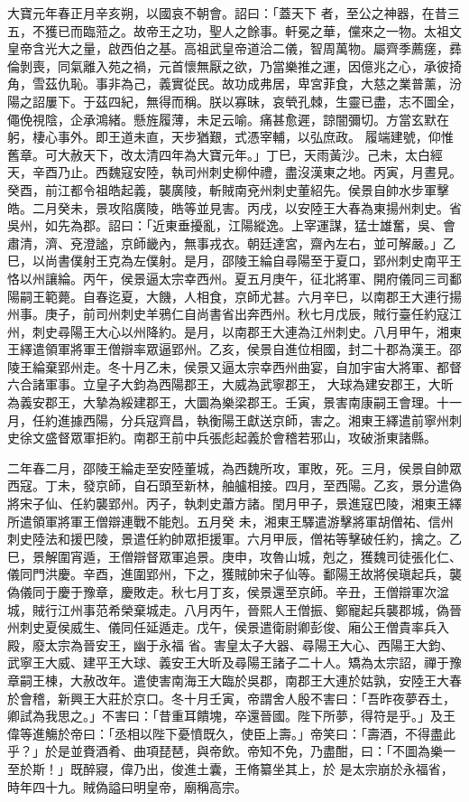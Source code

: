 \begin{pinyinscope}
 大寶元年春正月辛亥朔，以國哀不朝會。詔曰：「蓋天下
 者，至公之神器，在昔三五，不獲已而臨蒞之。故帝王之功，聖人之餘事。軒冕之華，儻來之一物。太祖文皇帝含光大之量，啟西伯之基。高祖武皇帝道洽二儀，智周萬物。屬齊季薦瘥，彞倫剝喪，同氣離入苑之禍，元首懷無厭之欲，乃當樂推之運，因億兆之心，承彼掎角，雪茲仇恥。事非為己，義實從民。故功成弗居，卑宮菲食，大慈之業普薰，汾陽之詔屢下。于茲四紀，無得而稱。朕以寡昧，哀煢孔棘，生靈已盡，志不圖全，僶俛視陰，企承鴻緒。懸旌履薄，未足云喻。痛甚愈遲，諒闇彌切。方當玄默在躬，棲心事外。即王道未直，天步猶艱，式憑宰輔，以弘庶政。
 履端建號，仰惟舊章。可大赦天下，改太清四年為大寶元年。」丁巳，天雨黃沙。己未，太白經天，辛酉乃止。西魏寇安陸，執司州刺史柳仲禮，盡沒漢東之地。丙寅，月晝見。癸酉，前江都令祖皓起義，襲廣陵，斬賊南兗州刺史董紹先。侯景自帥水步軍擊皓。二月癸未，景攻陷廣陵，皓等並見害。丙戌，以安陸王大春為東揚州刺史。省吳州，如先為郡。詔曰：「近東垂擾亂，江陽縱逸。上宰運謀，猛士雄奮，吳、會肅清，濟、兗澄謐，京師畿內，無事戎衣。朝廷達宮，齋內左右，並可解嚴。」乙巳，以尚書僕射王克為左僕射。是月，邵陵王綸自尋陽至于夏口，郢州刺史南平王
 恪以州讓綸。丙午，侯景逼太宗幸西州。夏五月庚午，征北將軍、開府儀同三司鄱陽嗣王範薨。自春迄夏，大饑，人相食，京師尤甚。六月辛巳，以南郡王大連行揚州事。庚子，前司州刺史羊鴉仁自尚書省出奔西州。秋七月戊辰，賊行臺任約寇江州，刺史尋陽王大心以州降約。是月，以南郡王大連為江州刺史。八月甲午，湘東王繹遣領軍將軍王僧辯率眾逼郢州。乙亥，侯景自進位相國，封二十郡為漢王。邵陵王綸棄郢州走。冬十月乙未，侯景又逼太宗幸西州曲宴，自加宇宙大將軍、都督六合諸軍事。立皇子大鈞為西陽郡王，大威為武寧郡王，
 大球為建安郡王，大昕為義安郡王，大摯為綏建郡王，大圜為樂梁郡王。壬寅，景害南康嗣王會理。十一月，任約進據西陽，分兵寇齊昌，執衡陽王獻送京師，害之。湘東王繹遣前寧州刺史徐文盛督眾軍拒約。南郡王前中兵張彪起義於會稽若邪山，攻破浙東諸縣。



 二年春二月，邵陵王綸走至安陸董城，為西魏所攻，軍敗，死。三月，侯景自帥眾西寇。丁未，發京師，自石頭至新林，舳艫相接。四月，至西陽。乙亥，景分遣偽將宋子仙、任約襲郢州。丙子，執刺史蕭方諸。閏月甲子，景進寇巴陵，湘東王繹所遣領軍將軍王僧辯連戰不能剋。五月癸
 未，湘東王驛遣游擊將軍胡僧祐、信州刺史陸法和援巴陵，景遣任約帥眾拒援軍。六月甲辰，僧祐等擊破任約，擒之。乙巳，景解圍宵遁，王僧辯督眾軍追景。庚申，攻魯山城，剋之，獲魏司徒張化仁、儀同門洪慶。辛酉，進圍郢州，下之，獲賊帥宋子仙等。鄱陽王故將侯瑱起兵，襲偽儀同于慶于豫章，慶敗走。秋七月丁亥，侯景還至京師。辛丑，王僧辯軍次湓城，賊行江州事范希榮棄城走。八月丙午，晉熙人王僧振、鄭寵起兵襲郡城，偽晉州刺史夏侯威生、儀同任延遁走。戊午，侯景遣衛尉卿彭俊、廂公王僧貴率兵入殿，廢太宗為晉安王，幽于永福
 省。害皇太子大器、尋陽王大心、西陽王大鈞、武寧王大威、建平王大球、義安王大昕及尋陽王諸子二十人。矯為太宗詔，禪于豫章嗣王棟，大赦改年。遣使害南海王大臨於吳郡，南郡王大連於姑孰，安陸王大春於會稽，新興王大莊於京口。冬十月壬寅，帝謂舍人殷不害曰：「吾昨夜夢吞土，卿試為我思之。」不害曰：「昔重耳饋塊，卒還晉國。陛下所夢，得符是乎。」及王偉等進觴於帝曰：「丞相以陛下憂憤既久，使臣上壽。」帝笑曰：「壽酒，不得盡此乎？」於是並賚酒肴、曲項琵琶，與帝飲。帝知不免，乃盡酣，曰：「不圖為樂一至於斯！」既醉寢，偉乃出，俊進土囊，王脩纂坐其上，於
 是太宗崩於永福省，時年四十九。賊偽謚曰明皇帝，廟稱高宗。




\end{pinyinscope}
